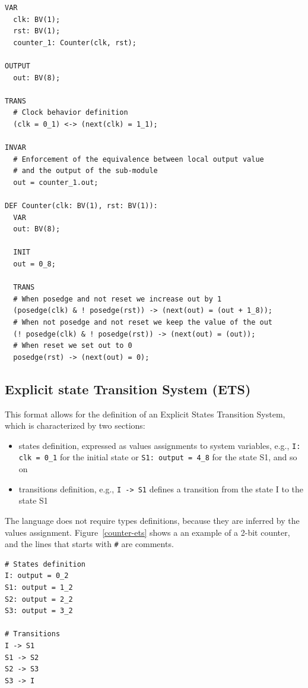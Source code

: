 \documentclass{article}
\theoremstyle{definition}
\begin{document}
\begin{lstlisting}[frame=single,language=sts,caption=Counter example (hierarchical),label=counterh-sts]
VAR
  clk: BV(1);
  rst: BV(1);
  counter_1: Counter(clk, rst);

OUTPUT
  out: BV(8);

TRANS
  # Clock behavior definition
  (clk = 0_1) <-> (next(clk) = 1_1);

INVAR
  # Enforcement of the equivalence between local output value
  # and the output of the sub-module
  out = counter_1.out;

DEF Counter(clk: BV(1), rst: BV(1)):
  VAR
  out: BV(8);

  INIT
  out = 0_8;

  TRANS
  # When posedge and not reset we increase out by 1
  (posedge(clk) & ! posedge(rst)) -> (next(out) = (out + 1_8));
  # When not posedge and not reset we keep the value of the out
  (! posedge(clk) & ! posedge(rst)) -> (next(out) = (out));
  # When reset we set out to 0
  posedge(rst) -> (next(out) = 0);
\end{lstlisting}


\subsection{Explicit state Transition System (ETS)}

This format allows for the definition of an Explicit States Transition System, which is characterized by two sections:
\begin{itemize}
\item states definition, expressed as values assignments to system
  variables, e.g., \texttt{I: clk = 0\_1} for the initial state or
  \texttt{S1: output = 4\_8} for the state S1, and so on
\item transitions definition, e.g., \texttt{I -> S1} defines a
  transition from the state I to the state S1
\end{itemize}

The language does not require types definitions, because they are
inferred by the values assignment. Figure~\ref{counter-ets} shows a an
example of a 2-bit counter, and the lines that starts with \texttt{\#}
are comments.

\begin{lstlisting}[frame=single,language=ets,caption=2-bit Counter,label=counter-ets]
# States definition
I: output = 0_2
S1: output = 1_2
S2: output = 2_2
S3: output = 3_2

# Transitions
I -> S1
S1 -> S2
S2 -> S3
S3 -> I
\end{lstlisting}
\end{document}
